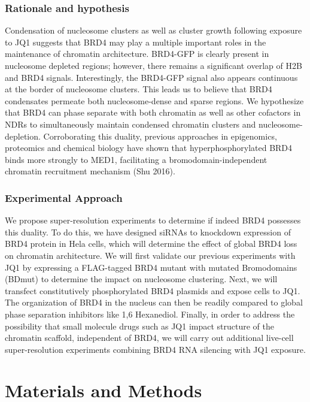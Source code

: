 \documentclass{ucetd}
\begin{document}
\subsubsection{Rationale and hypothesis}

Condensation of nucleosome clusters as well as cluster growth following exposure to JQ1 suggests that BRD4 may play a multiple important roles in the maintenance of chromatin architecture. BRD4-GFP is clearly present in nucleosome depleted regions; however, there remains a significant overlap of H2B and BRD4 signals. Interestingly, the BRD4-GFP signal also appears continuous at the border of nucleosome clusters. This leads us to believe that BRD4 condensates permeate both nucleosome-dense and sparse regions. We hypothesize that BRD4 can phase separate with both chromatin as well as other cofactors in NDRs to simultaneously maintain condensed chromatin clusters and nucleosome-depletion. Corroborating this duality, previous approaches in epigenomics, proteomics and chemical biology have shown that hyperphosphorylated BRD4 binds more strongly to MED1, facilitating a bromodomain-independent chromatin recruitment mechanism (Shu 2016). 


\subsubsection{Experimental Approach}

We propose super-resolution experiments to determine if indeed BRD4 possesses this duality. To do this, we have designed siRNAs to knockdown expression of BRD4 protein in Hela cells, which will determine the effect of global BRD4 loss on chromatin architecture. We will first validate our previous experiments with JQ1 by expressing a FLAG-tagged BRD4 mutant with mutated Bromodomains (BDmut) to determine the impact on nucleosome clustering. Next, we will transfect constitutively phosphorylated BRD4 plasmids and expose cells to JQ1. The organization of BRD4 in the nucleus can then be readily compared to global phase separation inhibitors like 1,6 Hexanediol. Finally, in order to address the possibility that small molecule drugs such as JQ1 impact structure of the chromatin scaffold, independent of BRD4, we will carry out additional live-cell super-resolution experiments combining BRD4 RNA silencing with JQ1 exposure.


\section{Materials and Methods}
\end{document}
